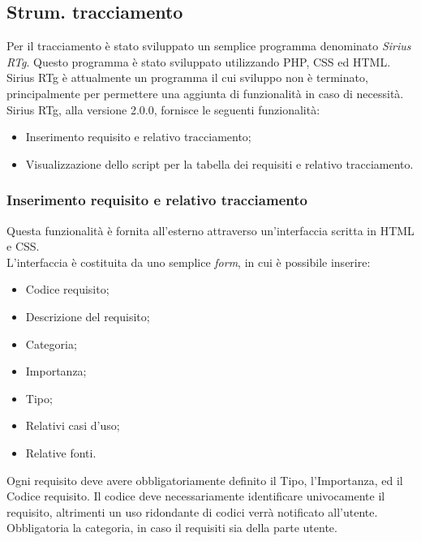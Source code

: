 \subsection{Strum. tracciamento}
Per il tracciamento è stato sviluppato un semplice programma denominato \textit{Sirius RTg}. Questo programma è stato sviluppato utilizzando PHP, CSS ed HTML. Sirius RTg è attualmente un programma il cui sviluppo non è terminato, principalmente per permettere una aggiunta di funzionalità in caso di necessità. Sirius RTg, alla versione 2.0.0, fornisce le seguenti funzionalità:
\begin{itemize}
\item Inserimento requisito e relativo tracciamento;
\item Visualizzazione dello script per la tabella dei requisiti e relativo tracciamento.
\end{itemize}
\subsubsection{Inserimento requisito e relativo tracciamento}
Questa funzionalità è fornita all'esterno attraverso un'interfaccia scritta in HTML e CSS.\\
L'interfaccia è costituita da uno semplice \textit{form}, in cui è possibile inserire:
\begin{itemize}
\item Codice requisito;
\item Descrizione del requisito;
\item Categoria;
\item Importanza;
\item Tipo;
\item Relativi casi d'uso;
\item Relative fonti.
\end{itemize}
Ogni requisito deve avere obbligatoriamente definito il Tipo, l'Importanza, ed il Codice requisito. Il codice deve necessariamente identificare univocamente il requisito, altrimenti un uso ridondante di codici verrà notificato all'utente. Obbligatoria la categoria, in caso il requisiti sia della parte utente.
